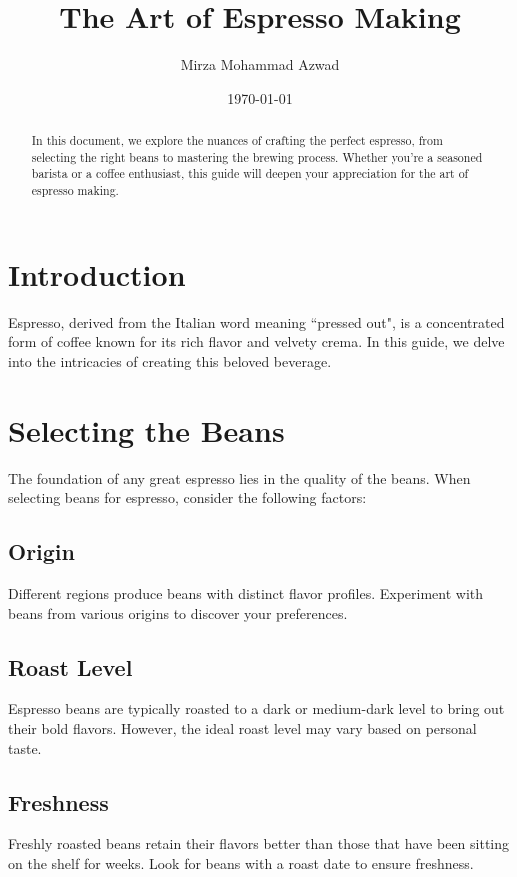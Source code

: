 \documentclass[12pt, a4paper]{article}
\title{The Art of Espresso Making}
\author{Mirza Mohammad Azwad}
\date{\today}
\begin{document}
\begin{titlepage}
    \maketitle
\tableofcontents
\end{titlepage}

\begin{abstract}
    In this document, we explore the nuances of crafting the perfect espresso, from selecting the right
beans to mastering the brewing process. Whether you’re a seasoned barista or a coffee enthusiast, this
guide will deepen your appreciation for the art of espresso making.
\end{abstract}

\section{Introduction}
Espresso, derived from the Italian word meaning ``pressed out", is a concentrated form of coffee known for its rich flavor and velvety crema. In this guide, we delve into the intricacies of creating this beloved
beverage.
\section{Selecting the Beans}
The foundation of any great espresso lies in the quality of the beans. When selecting beans for espresso, consider the following factors:
\subsection{Origin}
Different regions produce beans with distinct flavor profiles. Experiment with beans from various origins to discover your preferences.
\subsection{Roast Level}
Espresso beans are typically roasted to a dark or medium-dark level to bring out their bold flavors. However, the ideal roast level may vary based on personal taste.
\subsection{Freshness}
Freshly roasted beans retain their flavors better than those that have been sitting on the shelf for weeks. Look for beans with a roast date to ensure freshness.
\end{document}
